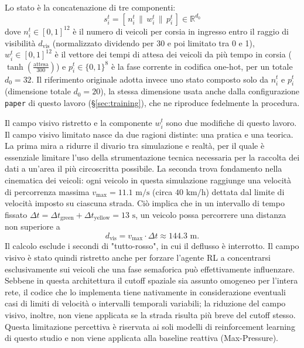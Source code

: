 Lo stato è la concatenazione di tre componenti:
\begin{equation}
  s_i^t = [\,n_i^t \,\|\, w_i^t \,\|\, p_i^t\,] \in \mathbb{R}^{d_0}
\end{equation}
dove $n_i^t \in [0,1]^{12}$ è il numero di veicoli per corsia in ingresso entro il raggio di visibilità $d_{\text{vis}}$ (normalizzato dividendo per 30 e poi limitato tra 0 e 1),
$w_i^t \in [0,1]^{12}$ è il vettore dei tempi di attesa dei veicoli da più tempo in corsia ($\tanh(\frac{\text{attesa}}{300})$) e
$p_i^t \in \{0,1\}^8$ è la fase corrente in codifica one-hot, per un totale $d_0 = 32$. Il riferimento originale adotta invece uno stato composto solo da $n_i^t$ e $p_i^t$ (dimensione totale $d_0=20$), la stessa dimensione usata anche dalla configurazione \texttt{paper} di questo lavoro (§\ref{sec:training}), che ne riproduce fedelmente la procedura.

Il campo visivo ristretto e la componente $w_i^t$ sono due modifiche di
questo lavoro. Il campo visivo limitato nasce da due ragioni distinte:
una pratica e una teorica. La prima mira a ridurre il divario tra
simulazione e realtà, per il quale è essenziale limitare l'uso della
strumentazione tecnica necessaria per la raccolta dei dati a un'area il
più circoscritta possibile. La seconda trova fondamento nella cinematica
dei veicoli: ogni veicolo in questa simulazione raggiunge una velocità di
percorrenza massima $v_{\max} = 11.1\text{ m/s}$ (circa $40\text{ km/h}$)
dettata dal limite di velocità imposto su ciascuna strada. Ciò implica che
in un intervallo di tempo fissato $\Delta t = \Delta t_{\text{green}} +
  \Delta t_{\text{yellow}} = 13\text{ s}$, un veicolo possa percorrere una
distanza non superiore a
\[d_{\text{vis}} = v_{\max} \cdot \Delta t \approx 144.3 \text{ m} .\]
Il calcolo esclude i secondi di "tutto-rosso", in cui il deflusso è
interrotto. Il campo visivo è stato quindi ristretto anche per forzare
l'agente RL a concentrarsi esclusivamente sui veicoli che una fase
semaforica può effettivamente influenzare. Sebbene in questa architettura
il cutoff spaziale sia assunto omogeneo per l'intera rete, il codice che
lo implementa tiene nativamente in considerazione eventuali casi di
limiti di velocità o intervalli temporali variabili; la riduzione del
campo visivo, inoltre, non viene applicata se la strada risulta più breve
del cutoff stesso. Questa limitazione percettiva è riservata ai soli
modelli di reinforcement learning di questo studio e non viene applicata
alla baseline reattiva (Max-Pressure).

